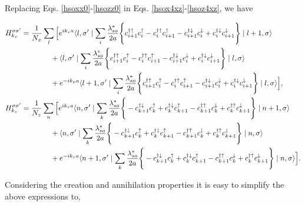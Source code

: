 \documentclass[10pt,prb,showpacs,amssymb,floatfix]{revtex4-1}
\newcommand{\nn}{\nonumber}
\begin{document}
Replacing Eqs. \eqref{hsoxx0}-\eqref{hsozz0} in Eqs. \eqref{hsox4xz}-\eqref{hsoz4xz}, we have

\begin{align}
\label{hsoxx5xz}
H_{k_x}^{\sigma \sigma'} &= \frac{1}{N_x}\sum_{l} \Big{[} e^{i k_x a} \langle l,\sigma' \mid \sum_{i} \frac{\lambda_{so}^*}{2a}  \Bigg{\{} c_{i+1}^{\dagger \uparrow} c_{i}^\uparrow - c_{i}^{\dagger \uparrow} c_{i+1}^\uparrow  - c_{i+1}^{\dagger \downarrow} c_{i}^\downarrow + c_{i}^{\dagger \downarrow} c_{i+1}^\downarrow \Bigg{\}} \mid l+1,\sigma\rangle \nn\\& ~~~~~~~~~~~~+ \langle l,\sigma' \mid \sum_{i} \frac{\lambda_{so}^*}{2a}  \Bigg{\{} c_{i+1}^{\dagger \uparrow} c_{i}^\uparrow - c_{i}^{\dagger \uparrow} c_{i+1}^\uparrow  - c_{i+1}^{\dagger \downarrow} c_{i}^\downarrow + c_{i}^{\dagger \downarrow} c_{i+1}^\downarrow \Bigg{\}} \mid l,\sigma\rangle  \nn\\& ~~~~~~~~~~~~+ e^{-i k_x a} \langle l+1,\sigma' \mid \sum_{i} \frac{\lambda_{so}^*}{2a}  \Bigg{\{} c_{i+1}^{\dagger \uparrow} c_{i}^\uparrow - c_{i}^{\dagger \uparrow} c_{i+1}^\uparrow  - c_{i+1}^{\dagger \downarrow} c_{i}^\downarrow + c_{i}^{\dagger \downarrow} c_{i+1}^\downarrow \Bigg{\}} \mid l,\sigma\rangle \Big{]}, \\
H_{k_z}^{\sigma \sigma'} &= \frac{1}{N_z}\sum_{n} \Big{[} e^{i k_z a} \langle n,\sigma' \mid \sum_{k}  \frac{\lambda_{so}^*}{2a} \Bigg{\{} -c_{k+1}^{\dagger \downarrow} c_{k}^\uparrow + c_{k}^{\dagger \downarrow} c_{k+1}^\uparrow   - c_{k+1}^{\dagger \uparrow} c_{k}^\downarrow +  c_{k}^{\dagger \uparrow} c_{k+1}^\downarrow \Bigg{\}} \mid n+1,\sigma\rangle \nn\\& ~~~~~~~~~~~~+  \langle n,\sigma' \mid \sum_{k}  \frac{\lambda_{so}^*}{2a} \Bigg{\{} -c_{k+1}^{\dagger \downarrow} c_{k}^\uparrow + c_{k}^{\dagger \downarrow} c_{k+1}^\uparrow   - c_{k+1}^{\dagger \uparrow} c_{k}^\downarrow +  c_{k}^{\dagger \uparrow} c_{k+1}^\downarrow \Bigg{\}} \mid n,\sigma\rangle  \nn\\& ~~~~~~~~~~~~ + e^{-i k_z a} \langle n+1,\sigma' \mid \sum_{k}  \frac{\lambda_{so}^*}{2a} \Bigg{\{} -c_{k+1}^{\dagger \downarrow} c_{k}^\uparrow + c_{k}^{\dagger \downarrow} c_{k+1}^\uparrow   - c_{k+1}^{\dagger \uparrow} c_{k}^\downarrow +  c_{k}^{\dagger \uparrow} c_{k+1}^\downarrow \Bigg{\}} \mid n,\sigma\rangle \Big{]}. 
\label{hsozz5xz}
\end{align}

Considering the creation and annihilation properties it is easy to simplify the above expressions to,
\end{document}
